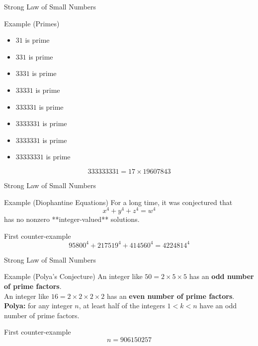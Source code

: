 \documentclass{beamer}
\begin{document}
\begin{frame}{Strong Law of Small Numbers}
  \begin{block}{Example (Primes)}
    \begin{itemize}
\pause
      \item $31$ is prime
\pause
      \item $331$ is prime
\pause
      \item $3331$ is prime
\pause
      \item $33331$ is prime
\pause
      \item $333331$ is prime
\pause
      \item $3333331$ is prime
\pause
      \item $3333331$ is prime
\pause
      \item $33333331$ is prime
    \end{itemize}
\pause
    $$333333331 = 17\times 19607843$$
  \end{block}
\end{frame}

\begin{frame}{Strong Law of Small Numbers}
  \begin{block}{Example (Diophantine Equations)}
    For a long time, it was conjectured that
    $$x^4 + y^4 + z^4 = w^4$$
    has no nonzero **integer-valued** solutions.
  \end{block}
\pause
  \begin{block}{First counter-example}
    $$95800^4+217519^4+414560^4=4224814^4$$
  \end{block}
\end{frame}

\begin{frame}{Strong Law of Small Numbers}
\pause
  \begin{block}{Example (Polya's Conjecture)}
\pause
    An integer like $50 = 2\times 5\times 5$ has an \textbf{odd number of prime factors}.\\
\pause
    An integer like $16 = 2\times 2\times 2\times 2$ has an \textbf{even number of prime factors}.\\
\pause
    \textbf{Polya:} for any integer $n$, at least half of the integers $1 < k < n$ have an odd number of prime factors.
  \end{block}
\pause
  \begin{block}{First counter-example}
    $$n=906150257$$
  \end{block}
\end{frame}
\end{document}
